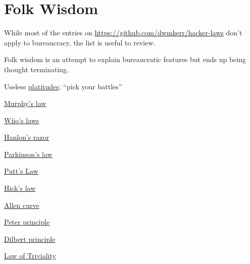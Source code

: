 \section{Folk Wisdom}
While most of the entries on
 \href{https://github.com/dwmkerr/hacker-laws}{https://github.com/dwmkerr/hacker-laws}
don't apply to bureaucracy, the list is useful to review. 


Folk wisdom is an attempt to explain bureaucratic features but ends up being \gls{thought terminating}.

Useless \href{https://en.wikipedia.org/wiki/Platitude}{platitudes}: ``pick your battles''

\href{https://en.wikipedia.org/wiki/Murphy\%27s_law}{Murphy's law}

\href{https://en.wikipedia.org/wiki/Wiio\%27s_laws}{Wiio's laws}

\href{https://en.wikipedia.org/wiki/Hanlon\%27s_razor}{Hanlon's razor}

\href{https://en.wikipedia.org/wiki/Parkinson\%27s_law}{Parkinson's law}

\href{https://en.wikipedia.org/wiki/Putt\%27s_Law_and_the_Successful_Technocrat}{Putt's Law}

\href{https://en.wikipedia.org/wiki/Hick\%27s_law}{Hick's law}

\href{https://en.wikipedia.org/wiki/Allen_curve}{Allen curve}

\href{https://en.wikipedia.org/wiki/Peter_principle}{Peter principle}

\href{https://en.wikipedia.org/wiki/Dilbert_principle}{Dilbert principle}

\href{https://en.wikipedia.org/wiki/Law_of_triviality}{Law of Triviality}